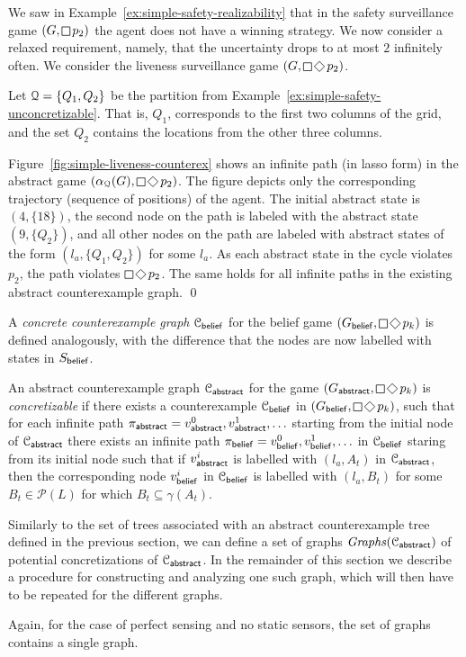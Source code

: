\begin{eg}\label{ex:simple-liveness-counterex}
We saw in Example~\ref{ex:simple-safety-realizability} that in the safety surveillance game $(G,\LTLglobally p_2)$ the agent does not have a winning strategy. %
We now consider a relaxed requirement, namely, that the uncertainty drops to at most $2$ infinitely often. We consider the liveness surveillance game 
$(G,\LTLglobally \LTLfinally p_2)$.

Let $\mathcal{Q} = \{Q_1,Q_2\}$ be the partition from Example~\ref{ex:simple-safety-unconcretizable}. That is, $Q_1$, corresponds to the first two columns of the grid, and the set $Q_2$ contains the locations from the other three columns. 


Figure~\ref{fig:simple-liveness-counterex} shows an infinite path (in lasso form) in the abstract game $(\alpha_\partition(G),\LTLglobally \LTLfinally p_2)$.  The figure depicts only the corresponding trajectory (sequence of positions) of the agent. The initial abstract state is $(4,\{18\})$, the second node on the path is labeled with the abstract state $(9,\{Q_2\})$, and all other nodes on the path are labeled with abstract states of the form $(l_a,\{Q_1,Q_2\})$ for some $l_a$. As each abstract state in the cycle violates $p_2$, the path violates $\LTLglobally \LTLfinally p_2$. The same holds for all infinite paths in the existing abstract counterexample graph.
\qed
\end{eg}

\bigskip

A \emph{concrete counterexample graph} $\mathcal{C}_{\mathsf{belief}}$ for the belief game $(G_\belief,\LTLglobally\LTLfinally p_k)$ is defined analogously, with the difference that the nodes are now labelled with states in $S_{\mathsf{belief}}$.

An abstract counterexample graph $\mathcal{C}_{\mathsf{abstract}}$ for the game $(G_\abstr,\LTLglobally\LTLfinally p_k)$ is \emph{concretizable} if there exists a counterexample
$\mathcal{C}_{\mathsf{belief}}$ in $(G_\belief,\LTLglobally \LTLfinally p_k)$, such that for each infinite path $\pi_{\mathsf{abstract}} = v_{\mathsf{abstract}}^0,v_{\mathsf{abstract}}^1,\ldots$ starting from the initial node of $\mathcal{C}_{\mathsf{abstract}}$ there exists an infinite path $\pi_{\mathsf{belief}} = v_{\mathsf{belief}}^0,v_{\mathsf{belief}}^1,\ldots$ in $\mathcal{C}_{\mathsf{belief}}$ staring from its initial node such that if $v_{\mathsf{abstract}}^i$ is labelled with $(l_a,A_t)$ in $\mathcal{C}_{\mathsf{abstract}}$, then the corresponding node $v_{\mathsf{belief}}^i$ in $\mathcal{C}_{\mathsf{belief}}$ is labelled with $(l_a,B_t)$ for some $B_t \in \mathcal{P}(L)$ for which $B_t \subseteq \gamma(A_t)$.

Similarly to the set of trees associated with an abstract counterexample tree defined in the previous section, we can define a set of graphs $\mathit{Graphs}(\mathcal{C}_{\mathsf{abstract}})$ of potential concretizations of $\mathcal{C}_{\mathsf{abstract}}$. In the remainder of this section we describe a procedure for constructing and analyzing one such graph, which will then have to be repeated for the different graphs.

Again, for the case of perfect sensing and no static sensors, the set of graphs contains a single graph. 